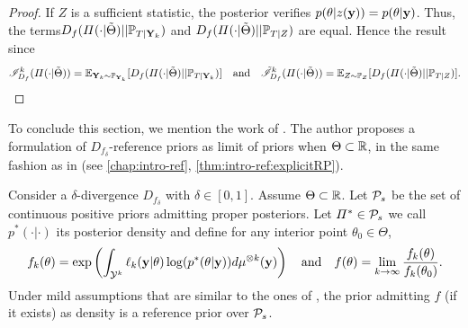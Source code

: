 \begin{proof}
    If $Z$ is a sufficient statistic, the posterior verifies $p(\theta|z(\mathbf{y}))= p(\theta|\mathbf{y})$. Thus, the terms$D_f(\varPi(\cdot|\tilde\Theta)||\mathbb{P}_{T|\mathbf{Y}_k})$ and $D_f(\varPi(\cdot|\tilde\Theta)||\mathbb{P}_{T|Z})  $ are equal. Hence the result since
        \begin{equation}
            \mathscr{I}^k_{D_f}(\varPi(\cdot|\tilde\Theta)) = \mathbb{E}_{\mathbf{Y}_k\sim\mathbb{P}_{\mathbf{Y}_k}}[D_f(\varPi(\cdot|\tilde\Theta)||\mathbb{P}_{T|\mathbf{Y}_k}) ] \quad\text{and} \quad \tilde{\mathscr{I}}^k_{D_f}(\varPi(\cdot|\tilde\Theta)) = \mathbb{E}_{ Z\sim\mathbb{P}_{Z}}[D_f(\varPi(\cdot|\tilde\Theta)||\mathbb{P}_{T|Z}) ] .
        \end{equation}
\end{proof}


To conclude this section, we mention the work of \citet{le_formal_2014}. The author proposes a formulation of  $D_{f_\delta}$-reference priors as limit of priors when $\Theta\subset\mathbb{R}$, in the same fashion as in \cite{berger_formal_2009} (see \cref{chap:intro-ref}, \cref{thm:intro-ref:explicitRP}).
\begin{thm}
    Consider a $\delta$-divergence $D_{f_\delta}$ with $\delta\in[0,1]$. Assume $\Theta\subset\mathbb{R}$. Let $\mathcal{P}_s$ be the set of continuous positive priors admitting proper posteriors.
%
    Let $\varPi^\ast\in\mathcal{P}_s$ we call $p^\ast(\cdot|\cdot)$ its posterior density and define for any interior point $\theta_0\in\Theta$,
        \begin{equation}
                f_k(\theta) = \exp\left(\int_{\cY^k}\ell_k(\mbf y|\theta)\log(p^\ast(\theta|\mbf y)) d\mu^{\otimes k}(\mbf y) \right) \quad\text{and}\quad  %
                f(\theta) = \lim_{k\rightarrow\infty}\frac{f_k(\theta)}{f_k(\theta_0)}.
        \end{equation}
        Under mild assumptions that are similar to the ones of \cite{berger_formal_2009}, the prior admitting $f$ (if it exists) as density is a reference prior over $\mathcal{P}_s$.
\end{thm}



